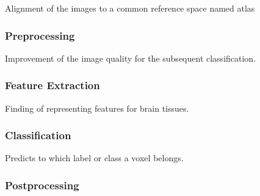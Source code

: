 \documentclass[journal]{IEEEtran}
\begin{document}
Alignment of the images to a common reference space named atlas

\subsubsection{Preprocessing}

Improvement of the image quality for the subsequent classification.

\subsubsection{Feature Extraction}

Finding of representing features for brain tissues.

\subsubsection{Classification}

Predicts to which label or class a voxel belongs.

\subsubsection{Postprocessing}
\end{document}
